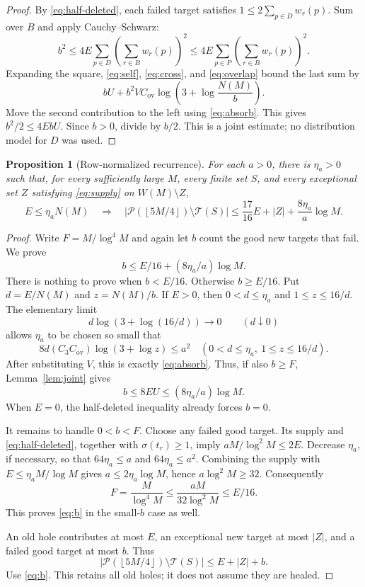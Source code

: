 \documentclass[11pt]{article}
\newtheorem{proposition}[theorem]{Proposition}
\theoremstyle{definition}
\theoremstyle{remark}
\newcommand{\PP}{\mathcal P}
\newcommand{\cT}{\mathcal T}
\newcommand{\sig}{\sigma}
\newcommand{\card}[1]{\lvert #1\rvert}
\newcommand{\floor}[1]{\left\lfloor #1\right\rfloor}
\begin{document}
\begin{proof}
By \eqref{eq:half-deleted}, each failed target satisfies
\(1\le2\sum_{p\in D}w_r(p)\). Sum over \(B\) and apply
Cauchy--Schwarz:
\[
 b^2\le4E\sum_{p\in D}\left(\sum_{r\in B}w_r(p)\right)^2
 \le4E\sum_{p\in P}\left(\sum_{r\in B}w_r(p)\right)^2.
\]
Expanding the square, \eqref{eq:self}, \eqref{eq:cross}, and
\eqref{eq:overlap} bound the last sum by
\[
 bU+b^2VC_{\mathrm{ov}}\log\!\left(3+\log\frac{N(M)}b\right).
\]
Move the second contribution to the left using \eqref{eq:absorb}.
This gives \(b^2/2\le4EbU\). Since \(b>0\), divide by \(b/2\).
This is a joint estimate; no distribution model for \(D\) was used.
\end{proof}

\begin{proposition}[Row-normalized recurrence]\label{prop:recurrence}
For each \(a>0\), there is \(\eta_a>0\) such that, for every sufficiently
large \(M\), every finite set \(S\), and every exceptional set \(Z\)
satisfying \eqref{eq:supply} on \(W(M)\setminus Z\),
\[
 E\le\eta_a N(M)\quad\Longrightarrow\quad
 \card{\PP(\floor{5M/4})\setminus\cT(S)}
 \le\frac{17}{16}E+\card Z+\frac{8\eta_a}{a}\log M.
\]
\end{proposition}

\begin{proof}
Write \(F=M/\log^4M\) and again let \(b\) count the good new targets
that fail. We prove
\begin{equation}\label{eq:b}
 b\le E/16+(8\eta_a/a)\log M.
\end{equation}
There is nothing to prove when \(b<E/16\). Otherwise
\(b\ge E/16\). Put \(d=E/N(M)\) and \(z=N(M)/b\).
If \(E>0\), then \(0<d\le\eta_a\) and \(1\le z\le16/d\).
The elementary limit
\[
 d\log(3+\log(16/d))\longrightarrow0\qquad(d\downarrow0)
\]
allows \(\eta_a\) to be chosen so small that
\[
 8d(C_3C_{\mathrm{ov}})\log(3+\log z)\le a^2
 \quad(0<d\le\eta_a,\ 1\le z\le16/d).
\]
After substituting \(V\), this is exactly \eqref{eq:absorb}.
Thus, if also \(b\ge F\), Lemma~\ref{lem:joint} gives
\[
 b\le8EU\le (8\eta_a/a)\log M.
\]
When \(E=0\), the half-deleted inequality already forces \(b=0\).

It remains to handle \(0<b<F\). Choose any failed good target.
Its supply and \eqref{eq:half-deleted}, together with
\(\sig(t_r)\ge1\), imply
\(aM/\log^2M\le2E\).
Decrease \(\eta_a\), if necessary, so that
\(64\eta_a\le a\) and \(64\eta_a\le a^2\).
Combining the supply with \(E\le\eta_a M/\log M\) gives
\(a\le2\eta_a\log M\), hence \(a\log^2M\ge32\).
Consequently
\[
 F=\frac{M}{\log^4M}\le
 \frac{aM}{32\log^2M}\le E/16.
\]
This proves \eqref{eq:b} in the small-\(b\) case as well.

An old hole contributes at most \(E\), an exceptional new target at
most \(\card Z\), and a failed good target at most \(b\). Thus
\[
 \card{\PP(\floor{5M/4})\setminus\cT(S)}\le E+\card Z+b.
\]
Use \eqref{eq:b}. This retains all old holes; it does not assume they
are healed.
\end{proof}
\end{document}
